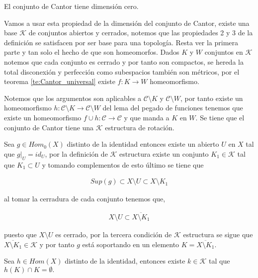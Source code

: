 \documentclass{subfiles}
\begin{document}
\begin{ob}
El conjunto de Cantor tiene dimensión cero.
\end{ob}

Vamos a usar esta propiedad de la dimensión del conjunto de Cantor, existe una base $\mathcal{K}$ de conjuntos abiertos y cerrados, notemos que las propiedades 2 y 3 de la definición se satisfacen por ser base para una topología. Resta ver la primera parte y tan solo el hecho de que son homeomorfos. Dados $K$ y $W$ conjuntos en $\mathcal{K}$ notemos que cada conjunto es cerrado y por tanto son compactos, se hereda la total disconexión y perfección como subespacios también son métricos, por el teorema \ref{te:Cantor_universal} existe $f:K \to W$ homeomorfismo.

Notemos que los argumentos son aplicables a $\mathcal{C} \setminus K$ y  $\mathcal{C} \setminus W$, por tanto existe un homeomorfismo $h:\mathcal{C} \setminus K \to \mathcal{C} \setminus W$ del lema del pegado de funciones tenemos que existe un homeomorfismo $f \cup h: \mathcal{C} \to \mathcal{C}$ y que  manda a $K$ en $W.$  Se tiene que el conjunto de Cantor tiene una $\mathcal{K}$ estructura de rotación. 


\begin{ob}\label{ob:hom_sop_en_Ks}
Sea $g \in Hom_0(X)$ distinto de la identidad entonces existe un abierto $U$ en $X$ tal que $g|_U=id_U$, por la definición de $\mathcal{K}$ estructura existe un conjunto $K_1 \in \mathcal{K}$ tal que $K_1 \subset U$ y tomando complementos de esto último se tiene que 

	\begin{align*}
	Sup(g) \subset X \setminus U \subset X \setminus K_1
	\end{align*}

al tomar la cerradura de cada conjunto tenemos que,

	\begin{align*}
	X \setminus U \subset \overline{ X \setminus K_1}
	\end{align*}

puesto que $X \setminus U$ es cerrado, por la tercera condición de $\mathcal{K}$ estructura se sigue que $\overline{ X \setminus K_1} \in \mathcal{K}$ y por tanto $g$ está soportando en un elemento $K = \overline{ X \setminus K_1}$.
\end{ob}



\begin{lm}\label{lm:K_separado_por_h}
Sea $h \in Hom(X)$ distinto de la identidad, entonces existe $k \in \mathcal{K}$ tal que $h(K) \cap K = \emptyset.$
\end{lm}
\end{document}
